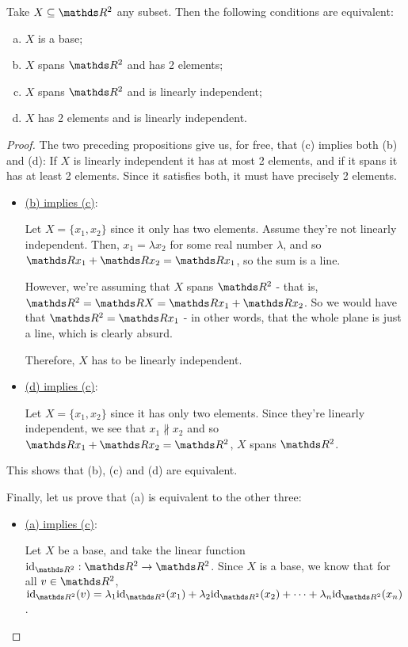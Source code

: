 \begin{theorem}
	Take $X\subseteq \R^2$ any subset. Then the following conditions are equivalent:
	\begin{enumerate}[(a)]
		\item $X$ is a base;
		\item $X$ spans $\R^2$ and has 2 elements;
		\item $X$ spans $\R^2$ and is linearly independent;
		\item $X$ has 2 elements and is linearly independent.
	\end{enumerate}
\end{theorem}
\begin{proof}
	The two preceding propositions give us, for free, that (c) implies both (b) and (d): If $X$ is linearly independent it has at most 2 elements, and if it spans it has at least 2 elements. Since it satisfies both, it must have precisely 2 elements.
	
	\begin{itemize}
		\item \underline{(b) implies (c)}:
		
		Let $X=\{x_1,x_2\}$ since it only has two elements. Assume they're not linearly independent. Then, $x_1=\lambda x_2$ for some real number $\lambda$, and so $\R x_1+\R x_2=\R x_1$, so the sum is a line.
		
		However, we're assuming that $X$ spans $\R^2$ - that is, $\R^2=\R X=\R x_1+\R x_2$. So we would have that $\R^2=\R x_1$ - in other words, that the whole plane is just a line, which is clearly absurd.
		
		Therefore, $X$ has to be linearly independent.
		
		\item \underline{(d) implies (c)}:
		
		Let $X=\{x_1,x_2\}$ since it has only two elements. Since they're linearly independent, we see that $x_1\nparallel x_2$ and so $\R x_1+\R x_2=\R^2$, $X$ spans $\R^2$.
	\end{itemize}

This shows that (b), (c) and (d) are equivalent.

Finally, let us prove that (a) is equivalent to the other three:
\begin{itemize}
	
	\item \underline{(a) implies (c)}:
	
	Let $X$ be a base, and take the linear function $\id_{\R^2}:\R^2\to \R^2$. Since $X$ is a base, we know that for all $v\in \R^2$, $\id_{\R^2}(v)=\lambda_1\id_{\R^2}(x_1)+\lambda_2\id_{\R^2}(x_2)+\cdots+\lambda_n\id_{\R^2}(x_n)$.
	

\end{itemize}
\end{proof}
